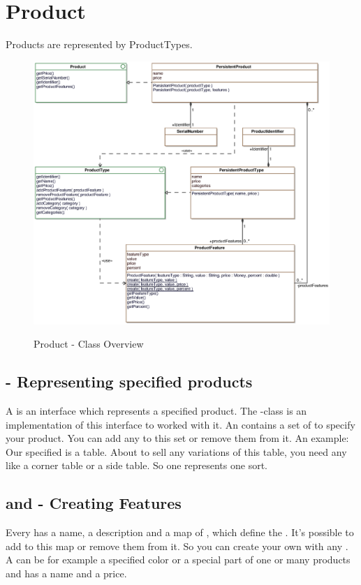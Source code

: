\newpage
\section{Product}

Products are represented by ProductTypes.

\begin{figure}[ht]
	\centering
  \includegraphics[width=1.0\textwidth]{images/Product_Overview.eps}
	\label{product_overview}
	\caption{Product - Class Overview}
\end{figure}

\subsection{ - Representing specified products}
A  is an interface which represents a specified product. The -class is an implementation of this interface to worked with it.
An  contains a set of  to specify your product. You can add any   to this set or remove them from it.
An example: Our specified  is a table. About to sell any variations of this table, you need any  like a corner table or a side table. 
So one  represents one sort.

\subsection{ and  - Creating Features}
Every  has a name, a description and a map of , which define the . It's possible to add 
 to this map or remove them from it. So you can create your own  with any .\\
A  can be for example a specified color or a special part of one or many products and has a name and a price.   

